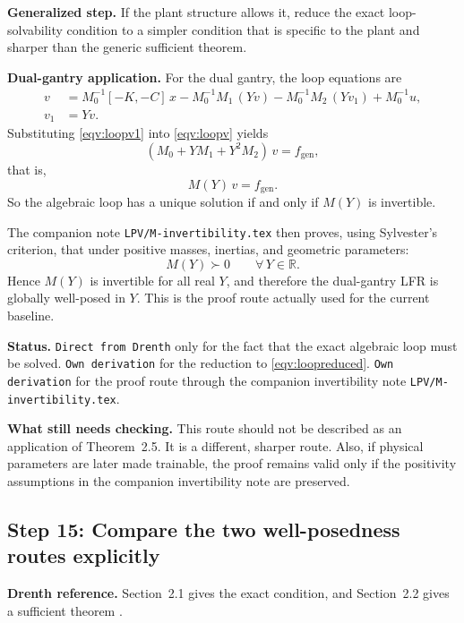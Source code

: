 \documentclass[11pt]{article}
\newcommand{\R}{\mathbb{R}}
\newcommand{\audititem}[2]{\par\smallskip\noindent\textbf{#1.} #2\par}
\newcommand{\statusline}[1]{\texttt{#1}}
\begin{document}
\audititem{Generalized step}{If the plant structure allows it, reduce the exact
loop-solvability condition to a simpler condition that is specific to the plant
and sharper than the generic sufficient theorem.}

\audititem{Dual-gantry application}{For the dual gantry, the loop equations are
\begin{align}
    v   &= M_0^{-1}[-K,-C]\,x - M_0^{-1}M_1\,(Yv)
           - M_0^{-1}M_2\,(Yv_1) + M_0^{-1}u,
           \label{eqv:loopv} \\
    v_1 &= Yv. \label{eqv:loopv1}
\end{align}
Substituting \eqref{eqv:loopv1} into \eqref{eqv:loopv} yields
\[
(M_0 + YM_1 + Y^2 M_2)\,v = f_{\mathrm{gen}},
\]
that is,
\begin{equation}
    M(Y)\,v = f_{\mathrm{gen}}.
    \label{eqv:loopreduced}
\end{equation}
So the algebraic loop has a unique solution if and only if $M(Y)$ is
invertible.

The companion note \texttt{LPV/M-invertibility.tex} then proves, using
Sylvester's criterion, that under positive masses, inertias, and geometric
parameters:
\[
M(Y) \succ 0 \qquad \forall\, Y \in \R.
\]
Hence $M(Y)$ is invertible for all real $Y$, and therefore the dual-gantry LFR
is globally well-posed in $Y$. This is the proof route actually used for the
current baseline.}

\audititem{Status}{\statusline{Direct from Drenth} only for the fact that the
exact algebraic loop must be solved. \statusline{Own derivation} for the
reduction to \eqref{eqv:loopreduced}. \statusline{Own derivation} for the proof
route through the companion invertibility note \texttt{LPV/M-invertibility.tex}.}

\audititem{What still needs checking}{This route should not be described as an
application of Theorem~2.5. It is a different, sharper route.
Also, if physical parameters are later made trainable, the proof remains valid
only if the positivity assumptions in the companion invertibility note are
preserved.}

\subsection{Step 15: Compare the two well-posedness routes explicitly}

\audititem{Drenth reference}{Section~2.1 gives the exact condition, and
Section~2.2 gives a sufficient theorem \cite{drenth2025thesis}.}
\end{document}
